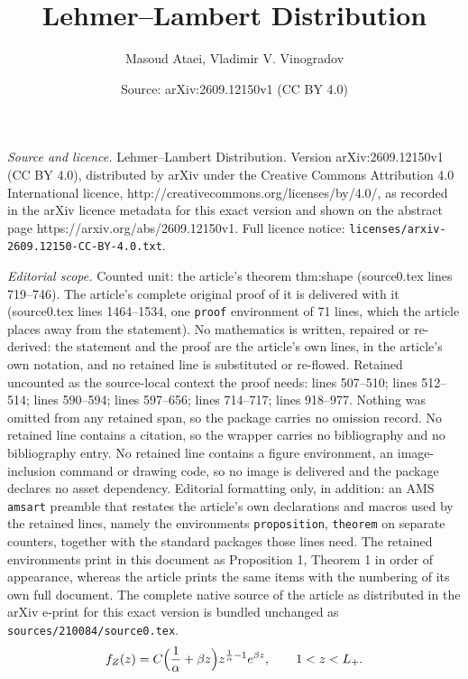 \documentclass[10pt,a4paper]{amsart}
\title{Lehmer--Lambert Distribution}
\author{Masoud Ataei, Vladimir V. Vinogradov}
\date{Source: arXiv:2609.12150v1 (CC BY 4.0)}
\begin{document}
\maketitle

\noindent\emph{Source and licence.} Lehmer--Lambert Distribution. Version arXiv:2609.12150v1 (CC BY 4.0), distributed by arXiv under the Creative Commons Attribution 4.0 International licence, http://creativecommons.org/licenses/by/4.0/, as recorded in the arXiv licence metadata for this exact version and shown on the abstract page https://arxiv.org/abs/2609.12150v1. Full licence notice: \texttt{licenses/arxiv-2609.12150-CC-BY-4.0.txt}.\par\smallskip

\noindent\textit{Editorial scope.} Counted unit: the article's theorem thm:shape (source0.tex lines 719--746). The article's complete original proof of it is delivered with it (source0.tex lines 1464--1534, one \texttt{proof} environment of 71 lines, which the article places away from the statement). No mathematics is written, repaired or re-derived: the statement and the proof are the article's own lines, in the article's own notation, and no retained line is substituted or re-flowed.  Retained uncounted as the source-local context the proof needs: lines 507--510; lines 512--514; lines 590--594; lines 597--656; lines 714--717; lines 918--977.  Nothing was omitted from any retained span, so the package carries no omission record.  No retained line contains a citation, so the wrapper carries no bibliography and no bibliography entry.  No retained line contains a figure environment, an image-inclusion command or drawing code, so no image is delivered and the package declares no asset dependency.  Editorial formatting only, in addition: an AMS \texttt{amsart} preamble that restates the article's own declarations and macros used by the retained lines, namely the environments \texttt{proposition}, \texttt{theorem} on separate counters, together with the standard packages those lines need.  The retained environments print in this document as Proposition 1, Theorem 1 in order of appearance, whereas the article prints the same items with the numbering of its own full document.  The complete native source of the article as distributed in the arXiv e-print for this exact version is bundled unchanged as \texttt{sources/210084/source0.tex}.
			\begin{equation}\label{eq:lgdensity}
				f_Z(z)=C\Bigl(\frac1\alpha+\beta z\Bigr)z^{\frac1\alpha-1}e^{\beta z},
				\qquad 1<z<L_+ .
			\end{equation}
\end{document}
